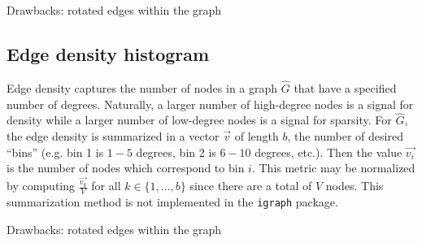 Drawbacks: rotated edges within the graph

\subsection{Edge density histogram}

Edge density captures the number of nodes in a graph $\hat{G}$ that have a 
specified number of degrees. Naturally, a larger number of high-degree nodes is 
a signal for density while a larger number of low-degree nodes is a signal for 
sparsity. For $\hat{G}$, the edge density is summarized in a 
vector $\overrightarrow{v}$ of length $b$, the number of desired ``bins'' 
(e.g. bin 1 is $1-5$ degrees, bin 2 is $6-10$ degrees, etc.). Then the value 
$\overrightarrow{v_i}$ is the number of nodes which correspond to bin $i$. This 
metric may be normalized by computing $\frac{\overrightarrow{v_k}}{V}$ for 
all $k \in \{1,...,b\}$ since there are a total of $V$ nodes. 
This summarization method is not implemented in the \texttt{igraph} package. 

Drawbacks: rotated edges within the graph